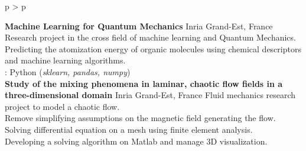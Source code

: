 \documentclass[cv]{cv_style}
\begin{document}
{\begin{tabular}{p{\leftsize\textwidth} > {\arraybackslash}p{\rightsize\textwidth}}
\begin{minipage}[t]{\rightsize\textwidth}

        \begin{minipage}[t]{.94\textwidth}
            \small
        
            \cvproject
            {\textbf{Machine Learning for Quantum Mechanics}}
            {Inria Grand-Est, France}
            {
                Research  project in the cross field of machine learning and Quantum Mechanics. \\
                \rightchevron\hspace{.04cm} Predicting the atomization energy of organic molecules using chemical descriptors
                and machine learning algorithms. \\
            }
            {
                \faGithub:  
            }
            {Python (\textit{sklearn, pandas, numpy})} 
\vspace{-0.45cm}\\
        \cvproject
        {\textbf{Study of the mixing phenomena in laminar, chaotic flow fields in a three-dimensional domain}}
            {Inria Grand-Est, France}
            {   
                Fluid mechanics research project to model a chaotic flow. \\
                \rightchevron\hspace{.1cm} Remove simplifying assumptions on the magnetic field generating the flow. \\
                \rightchevron\hspace{.1cm} Solving differential equation on a mesh using finite element analysis. \\
                \rightchevron\hspace{.1cm} Developing a solving algorithm on Matlab and manage 3D visualization. \\
                
}
\end{minipage}
\end{minipage}
\end{tabular}}
\end{document}

